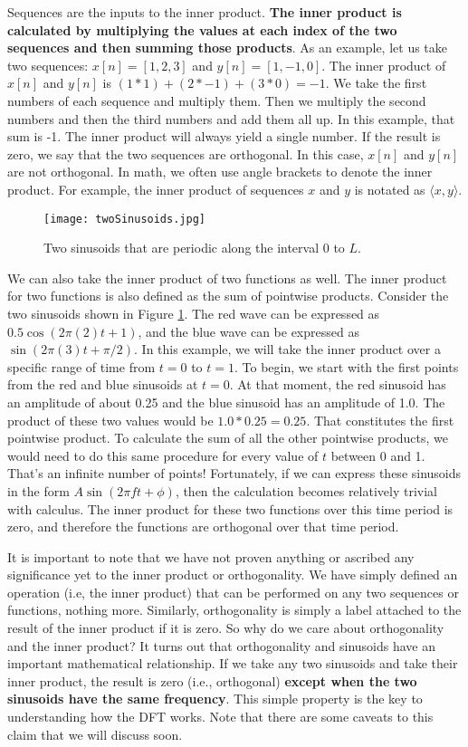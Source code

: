 Sequences are the inputs to the inner product.  \textbf{The inner product is calculated by multiplying
the values at each index of the two sequences and then summing those products}.  As an example, let us
take two sequences: $x[n] = [1, 2, 3]$ and $y[n] = [1, -1, 0]$.  The inner product of $x[n]$ and $y[n]$ is $(1 * 1) + (2 * -1) + (3 * 0) = -1$.
We take the first numbers of each sequence and multiply them.  Then we multiply the second
numbers and then the third numbers and add them all up.  In this example, that sum is -1.  The inner product 
will always yield a single number.  If the result is zero, we say that the two sequences are
orthogonal.  In this case, $x[n]$ and $y[n]$ are not orthogonal.  In math, we often use angle brackets to denote
the inner product.  For example, the inner product of sequences $x$ and $y$ is notated as $\langle x, y \rangle$.

\begin{figure}[h]
	\caption{Two sinusoids that are periodic along the interval 0 to $L$.}
	\centering
	\texttt{[image: twoSinusoids.jpg]}
	\label{fig:twoSines}
\end{figure}

We can also take the inner product of two functions as well.  The inner product for two functions is also defined
as the sum of pointwise products.  Consider the two sinusoids shown in Figure \ref{fig:twoSines}.  The red 
wave can be expressed as $0.5\cos(2\pi(2)t + 1)$, and the blue wave 
can be expressed as $\sin(2\pi(3)t + \pi/2)$.  In this example, we will take the inner product over a specific 
range of time from $t = 0$ to $t = 1$.  To begin, we start with
the first points from the red and blue sinusoids at $t = 0$.
At that moment, the red sinusoid has an amplitude of about 0.25 and the blue sinusoid has
an amplitude of 1.0.  The product of these two values would be $1.0 * 0.25 = 0.25$.  That constitutes the first pointwise product.
To calculate the sum of all the other pointwise products, we would need to do this same procedure for every value of $t$ between 0 and 1.  That's an infinite number of points!  Fortunately, 
if we can express these sinusoids in the form $A\sin(2\pi ft + \phi)$, then
the calculation becomes relatively trivial with calculus.  The inner product for these two functions over this time 
period is zero,
and therefore the functions are orthogonal over that time period.

It is important to note that we have not proven anything or ascribed any significance yet to the inner product
or orthogonality.  We have simply defined an operation (i.e, the inner product) that can be performed on any two sequences or functions,
nothing more.  Similarly, orthogonality is simply a label attached to the result of the inner product if it is zero.  
So why do we care about orthogonality and the inner product?  It turns out that orthogonality and 
sinusoids have an important 
mathematical relationship.  If we take any two sinusoids and take their inner product, the result is zero
(i.e., orthogonal) 
\textbf{except when the two sinusoids have the same frequency}.  This simple property is the key to 
understanding how the DFT works.  Note that there are some caveats to this claim that we will discuss soon.

